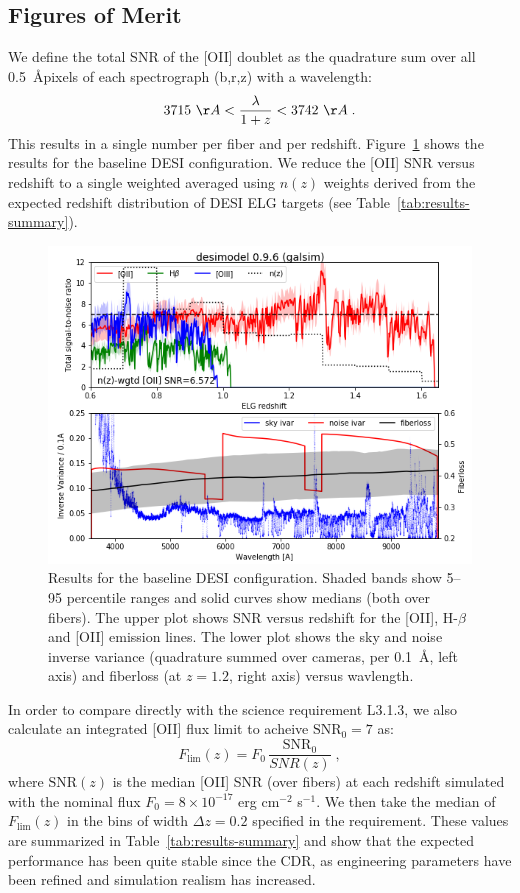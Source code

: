 \documentclass[12pt]{article}
\providecommand{\tab}[1]{Table~\ref{tab:#1}}
\providecommand{\fig}[1]{Figure~\ref{fig:#1}}
\begin{document}
\subsection{Figures of Merit}

We define the total SNR of the [OII] doublet as the quadrature sum over all 0.5~\AA pixels of each spectrograph (b,r,z) with a wavelength:
\begin{equation}
    3715~\AA < \frac{\lambda}{1 + z} < 3742~\AA \; .
\end{equation}
This results in a single number per fiber and per redshift. \fig{results-baseline} shows the results for the baseline DESI configuration.
We reduce the [OII] SNR versus redshift to a single weighted averaged using $n(z)$ weights derived from the expected redshift
distribution of DESI ELG targets (see \tab{results-summary}).

\begin{figure}[htb]
\begin{center}
\includegraphics[width=6in]{results-baseline}
\caption{Results for the baseline DESI configuration. Shaded bands show 5--95 percentile ranges and solid curves show medians (both over fibers).
The upper plot shows SNR versus redshift for the [OII], H-$\beta$ and [OII] emission lines. The lower plot shows the sky and noise inverse variance
(quadrature summed over cameras, per 0.1~\AA, left axis) and fiberloss (at $z=1.2$, right axis) versus wavlength.}
\label{fig:results-baseline}
\end{center}
\end{figure}

In order to compare directly with the science requirement L3.1.3, we also calculate an integrated [OII] flux limit to acheive $\text{SNR}_0 = 7$ as:
$$
F_{\text{lim}}(z) = F_0\,\frac{\text{SNR}_0}{SNR(z)} \; ,
$$
where $\text{SNR}(z)$ is the median [OII] SNR (over fibers) at each redshift simulated with the nominal flux $F_0 = 8\times 10^{-17}$ erg cm$^{-2}$ s$^{-1}$.
We then take the median of $F_{\text{lim}}(z)$ in the bins
of width $\Delta z = 0.2$ specified in the requirement. These values are summarized in \tab{results-summary} and show that the expected performance has
been quite stable since the CDR, as engineering parameters have been refined and simulation realism has increased.
\end{document}
